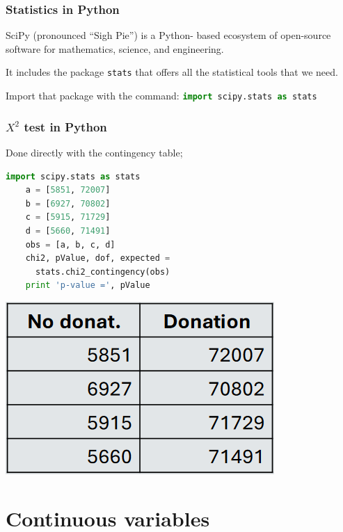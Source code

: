 \documentclass[]{project_plan}
\begin{document}
\subsubsection{Statistics in Python}

SciPy (pronounced “Sigh Pie”) is a Python-
based ecosystem of open-source software
for mathematics, science, and engineering.

It includes the package \lstinline|stats| that offers
all the statistical tools that we need.

Import that package with the command: \lstinline[language=Python]|import scipy.stats as stats|

\subsubsection{$X^2$ test in Python}

\begin{minipage}{0.6\linewidth}
  Done directly with the contingency table;\\
  \begin{lstlisting}[language=Python]
    import scipy.stats as stats
    a = [5851, 72007]
    b = [6927, 70802]
    c = [5915, 71729]
    d = [5660, 71491]
    obs = [a, b, c, d]
    chi2, pValue, dof, expected =
      stats.chi2_contingency(obs)
    print 'p-value =', pValue
    \end{lstlisting}
\end{minipage}
\hfill
\begin{minipage}{0.3\linewidth}
  \includegraphics[width=\linewidth]{python_contingency_table.png}
\end{minipage}

\section{Continuous variables}
\end{document}
